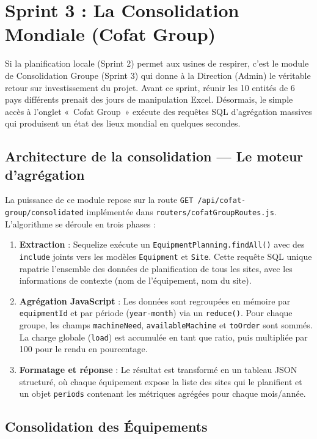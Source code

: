 \section{Sprint 3 : La Consolidation Mondiale (Cofat Group)}
Si la planification locale (Sprint 2) permet aux usines de respirer, c'est le module de Consolidation Groupe (Sprint 3) qui donne à la Direction (Admin) le véritable retour sur investissement du projet. Avant ce sprint, réunir les 10 entités de 6 pays différents prenait des jours de manipulation Excel. Désormais, le simple accès à l'onglet «~Cofat Group~» exécute des requêtes SQL d'agrégation massives qui produisent un état des lieux mondial en quelques secondes.

\subsection{Architecture de la consolidation — Le moteur d'agrégation}
La puissance de ce module repose sur la route \texttt{GET /api/cofat-group/consolidated} implémentée dans \texttt{routers/cofatGroupRoutes.js}. L'algorithme se déroule en trois phases :

\begin{enumerate}
    \item \textbf{Extraction} : Sequelize exécute un \texttt{EquipmentPlanning.findAll()} avec des \texttt{include} joints vers les modèles \texttt{Equipment} et \texttt{Site}. Cette requête SQL unique rapatrie l'ensemble des données de planification de tous les sites, avec les informations de contexte (nom de l'équipement, nom du site).
    \item \textbf{Agrégation JavaScript} : Les données sont regroupées en mémoire par \texttt{equipmentId} et par période (\texttt{year-month}) via un \texttt{reduce()}. Pour chaque groupe, les champs \texttt{machineNeed}, \texttt{availableMachine} et \texttt{toOrder} sont sommés. La charge globale (\texttt{load}) est accumulée en tant que ratio, puis multipliée par 100 pour le rendu en pourcentage.
    \item \textbf{Formatage et réponse} : Le résultat est transformé en un tableau JSON structuré, où chaque équipement expose la liste des sites qui le planifient et un objet \texttt{periods} contenant les métriques agrégées pour chaque mois/année.
\end{enumerate}

\subsection{Consolidation des Équipements}

